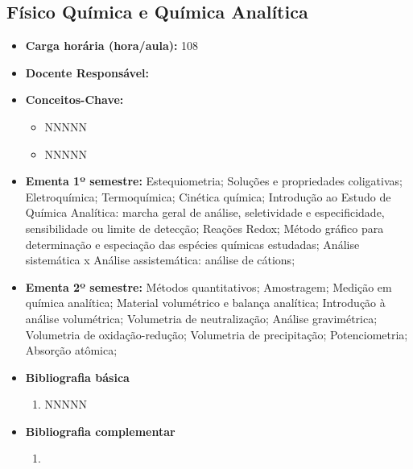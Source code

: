 \documentclass[11pt,fleqn]{book} %
\begin{document}
\subsection{Físico Química e Química Analítica}\label{disc:analitica}
\begin{itemize}
	\item \textbf{Carga horária (hora/aula):} 108
	\item \textbf{Docente Responsável:}
	\item \textbf{Conceitos-Chave:}
	\begin{itemize}
		\item NNNNN
		\item NNNNN
	\end{itemize}
	\item \textbf{Ementa 1º semestre:}
	Estequiometria;
	Soluções e propriedades coligativas;
	Eletroquímica;
	Termoquímica;
	Cinética química;
	Introdução ao Estudo de Química Analítica: marcha geral de análise, seletividade e especificidade, sensibilidade ou limite de detecção;
	Reações Redox; 
	Método gráfico para determinação e especiação das espécies químicas estudadas;
	Análise sistemática x Análise assistemática: análise de cátions; 
	\item \textbf{Ementa 2º semestre:}
	Métodos quantitativos;
	Amostragem; 
	Medição em química analítica; 
	Material volumétrico e balança analítica; 
	Introdução à análise volumétrica;
	Volumetria de neutralização;
	Análise gravimétrica; 
	Volumetria de oxidação-redução; 
	Volumetria de precipitação; 
	Potenciometria; 
	Absorção atômica;
	\item \textbf{Bibliografia básica}
	\begin{enumerate}
		\item NNNNN
	\end{enumerate}
	\item \textbf{Bibliografia complementar}
	\begin{enumerate}
		\item 
	\end{enumerate}	
\end{itemize}

\newpage
\end{document}
